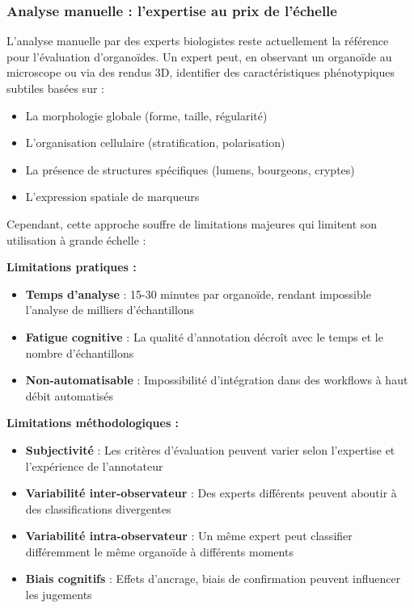 \subsubsection{Analyse manuelle : l'expertise au prix de l'échelle}

L'analyse manuelle par des experts biologistes reste actuellement la référence pour l'évaluation d'organoïdes. Un expert peut, en observant un organoïde au microscope ou via des rendus 3D, identifier des caractéristiques phénotypiques subtiles basées sur :
\begin{itemize}
    \item La morphologie globale (forme, taille, régularité)
    \item L'organisation cellulaire (stratification, polarisation)
    \item La présence de structures spécifiques (lumens, bourgeons, cryptes)
    \item L'expression spatiale de marqueurs
\end{itemize}

Cependant, cette approche souffre de limitations majeures qui limitent son utilisation à grande échelle :

\textbf{Limitations pratiques :}
\begin{itemize}
    \item \textbf{Temps d'analyse} : 15-30 minutes par organoïde, rendant impossible l'analyse de milliers d'échantillons
    \item \textbf{Fatigue cognitive} : La qualité d'annotation décroît avec le temps et le nombre d'échantillons
    \item \textbf{Non-automatisable} : Impossibilité d'intégration dans des workflows à haut débit automatisés
\end{itemize}

\textbf{Limitations méthodologiques :}
\begin{itemize}
    \item \textbf{Subjectivité} : Les critères d'évaluation peuvent varier selon l'expertise et l'expérience de l'annotateur
    \item \textbf{Variabilité inter-observateur} : Des experts différents peuvent aboutir à des classifications divergentes
    \item \textbf{Variabilité intra-observateur} : Un même expert peut classifier différemment le même organoïde à différents moments
    \item \textbf{Biais cognitifs} : Effets d'ancrage, biais de confirmation peuvent influencer les jugements
\end{itemize}


